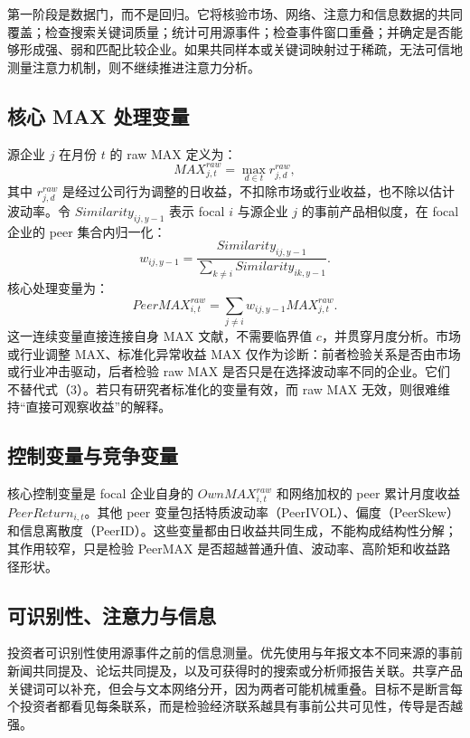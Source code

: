 \documentclass[UTF8,a4paper,11pt]{ctexart}
\begin{document}
第一阶段是数据门，而不是回归。它将核验市场、网络、注意力和信息数据的共同覆盖；检查搜索关键词质量；统计可用源事件；检查事件窗口重叠；并确定是否能够形成强、弱和匹配比较企业。如果共同样本或关键词映射过于稀疏，无法可信地测量注意力机制，则不继续推进注意力分析。

\subsection{核心 MAX 处理变量}
源企业 $j$ 在月份 $t$ 的 raw MAX 定义为：
\begin{equation}
MAX^{raw}_{j,t}=\max_{d\in t}r^{raw}_{j,d},
\end{equation}
其中 $r^{raw}_{j,d}$ 是经过公司行为调整的日收益，不扣除市场或行业收益，也不除以估计波动率。令 $Similarity_{ij,y-1}$ 表示 focal $i$ 与源企业 $j$ 的事前产品相似度，在 focal 企业的 peer 集合内归一化：
\begin{equation}
w_{ij,y-1}=\frac{Similarity_{ij,y-1}}
{\sum_{k\ne i}Similarity_{ik,y-1}}.
\end{equation}
核心处理变量为：
\begin{equation}
PeerMAX^{raw}_{i,t}=\sum_{j\ne i}w_{ij,y-1}MAX^{raw}_{j,t}.
\end{equation}
这一连续变量直接连接自身 MAX 文献，不需要临界值 $c$，并贯穿月度分析。市场或行业调整 MAX、标准化异常收益 MAX 仅作为诊断：前者检验关系是否由市场或行业冲击驱动，后者检验 raw MAX 是否只是在选择波动率不同的企业。它们不替代式（3）。若只有研究者标准化的变量有效，而 raw MAX 无效，则很难维持“直接可观察收益”的解释。

\subsection{控制变量与竞争变量}
核心控制变量是 focal 企业自身的 $OwnMAX^{raw}_{i,t}$ 和网络加权的 peer 累计月度收益 $PeerReturn_{i,t}$。其他 peer 变量包括特质波动率（PeerIVOL）、偏度（PeerSkew）和信息离散度（PeerID）。这些变量都由日收益共同生成，不能构成结构性分解；其作用较窄，只是检验 PeerMAX 是否超越普通升值、波动率、高阶矩和收益路径形状。

\subsection{可识别性、注意力与信息}
投资者可识别性使用源事件之前的信息测量。优先使用与年报文本不同来源的事前新闻共同提及、论坛共同提及，以及可获得时的搜索或分析师报告关联。共享产品关键词可以补充，但会与文本网络分开，因为两者可能机械重叠。目标不是断言每个投资者都看见每条联系，而是检验经济联系越具有事前公共可见性，传导是否越强。
\end{document}
